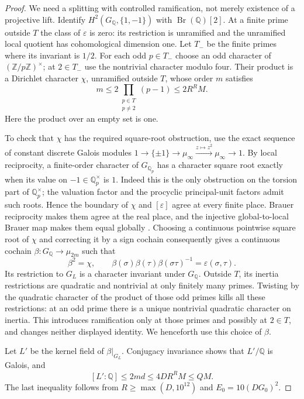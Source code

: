 \documentclass[11pt]{article}
\theoremstyle{definition}
\theoremstyle{remark}
\newcommand{\Q}{\mathbb Q}
\newcommand{\Z}{\mathbb Z}
\begin{document}
\begin{proof}
We need a splitting with controlled ramification, not merely
existence of a projective lift. Identify
$H^2(G_\Q,\{1,-1\})$ with $\operatorname{Br}(\Q)[2]$.
At a finite prime outside $T$ the class of $\varepsilon$ is zero:
its restriction is unramified and the unramified local quotient
has cohomological dimension one. Let $T_-$ be the finite primes
where its invariant is $1/2$. For each odd $p\in T_-$ choose an
odd character of $(\Z/p\Z)^\times$; at $2\in T_-$ use the
nontrivial character modulo four. Their product is a Dirichlet
character $\chi$, unramified outside $T$, whose order $m$ satisfies
\[
 m\le2\prod_{\substack{p\in T\\p\ne2}}(p-1)
       \le2R^R M.
\]
Here the product over an empty set is one.

To check that $\chi$ has the required square-root obstruction,
use the exact sequence of constant discrete Galois modules
$1\to\{\pm1\}\to\mu_\infty\xrightarrow{z\mapsto z^2}
\mu_\infty\to1$. By local reciprocity, a finite-order character
of $G_{\Q_p}$ has a character square root exactly when its value
on $-1\in\Q_p^\times$ is $1$. Indeed this is the only obstruction
on the torsion part of $\Q_p^\times$; the valuation factor and
the procyclic principal-unit factors admit such roots. Hence the
boundary of $\chi$ and $[\varepsilon]$ agree at every finite
place. Brauer reciprocity makes them agree at the real place,
and the injective global-to-local Brauer map makes them equal
globally \cite[Chapter I]{milne}.
Choosing a continuous pointwise square root of $\chi$ and
correcting it by a sign cochain consequently gives a continuous
cochain $\beta:G_\Q\to\mu_{2m}$ such that
\[
 \beta^2=\chi,\qquad
 \beta(\sigma)\beta(\tau)\beta(\sigma\tau)^{-1}
        =\varepsilon(\sigma,\tau).
\]
Its restriction to $G_L$ is a character invariant under $G_\Q$.
Outside $T$, its inertia restrictions are quadratic and nontrivial
at only finitely many primes. Twisting by the quadratic character
of the product of those odd primes kills all these restrictions:
at an odd prime there is a unique nontrivial quadratic character
on inertia. This introduces ramification only at those primes
and possibly at $2\in T$, and changes neither displayed identity.
We henceforth use this choice of $\beta$.

Let $L'$ be the kernel field of $\beta|_{G_L}$.
Conjugacy invariance shows that $L'/\Q$ is Galois, and
\[
 [L':\Q]\le2md\le4DR^R M\le QM.
\]
The last inequality follows from $R\ge\max(D,10^{12})$ and
$E_0=10(DG_0)^2$.


\end{proof}
\end{document}
